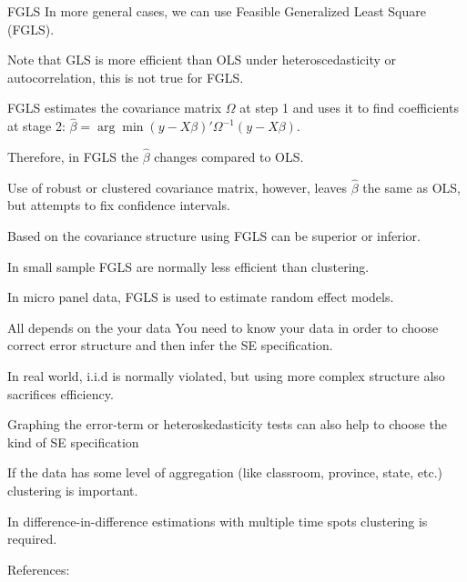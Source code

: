 \documentclass{beamer}
\begin{document}
\begin{frame}{FGLS}
In more general cases, we can use Feasible Generalized Least Square (FGLS).\medskip

Note that GLS is more efficient than OLS under heteroscedasticity or autocorrelation, this is not true for FGLS.\medskip

FGLS estimates the covariance matrix $\Omega$ at step 1 and uses it to find coefficients at stage 2: $\hat{\beta}=\arg\min (y-X\beta)'\Omega^{-1}(y-X\beta)$.\bigskip

Therefore, in FGLS the $\hat{\beta}$ changes compared to OLS. \medskip

Use of robust or clustered covariance matrix, however, leaves $\hat{\beta}$ the same as OLS, but attempts to fix confidence intervals.\medskip

Based on the covariance structure using FGLS can be superior or inferior.\medskip

In small sample FGLS are normally less efficient than clustering. \medskip %

In micro panel data, FGLS is used to estimate random effect models.

\end{frame}

\begin{frame}{All depends on the your data}
You need to know your data in order to choose correct error structure and then infer the SE specification. \bigskip

In real world, i.i.d is normally violated, but using more complex structure also sacrifices efficiency.\bigskip

Graphing the error-term or heteroskedasticity tests can also help to choose the kind of SE specification\bigskip

If the data has some level of aggregation (like classroom, province, state, etc.) clustering is important.\bigskip

In difference-in-difference estimations with multiple time spots clustering is required.\medskip



\end{frame}



\begin{frame}{References:}

\small

\end{frame}
\end{document}
